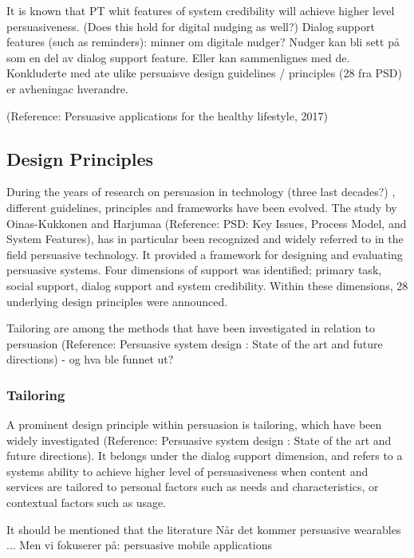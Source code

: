 It is known that PT whit features of system credibility will achieve higher level persuasiveness. (Does this hold for digital nudging as well?) 
Dialog support features (such as reminders): minner om digitale nudger? Nudger kan bli sett på som en del av dialog support feature. Eller kan sammenlignes med de. 
Konkluderte med ate ulike persuaisve design guidelines / principles (28 fra PSD) er avheningac hverandre. 


(Reference: Persuasive applications for the healthy lifestyle, 2017) 


\subsection{Design Principles}
During the years of research on persuasion in technology (three last decades?) , different guidelines, principles and frameworks have been evolved. The study by Oinas-Kukkonen and Harjumaa (Reference: PSD: Key Issues, Process Model, and System Features), has in particular been recognized and widely referred to in the field persuasive technology. It provided a framework for designing and evaluating persuasive systems. Four dimensions of support was identified; primary task, social support, dialog support and system credibility. Within these dimensions, 28 underlying design principles were announced. 

Tailoring are among the methods that have been investigated in relation to persuasion (Reference: Persuasive system design : State of the art and future directions) - og hva ble funnet ut?

\subsubsection{Tailoring}
A prominent design principle within persuasion is tailoring, which have been widely investigated (Reference: Persuasive system design : State of the art and future directions). It belongs under the dialog support dimension, and refers to a systems ability to achieve higher level of persuasiveness when content and services are tailored to personal factors such as needs and characteristics, or contextual factors such as usage. 

It should be mentioned that the literature 
Når det kommer persuasive wearables ... 
Men vi fokuserer på: persuasive mobile applications 

